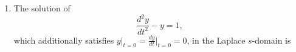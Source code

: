 \documentclass[12pt,onecolumn]{article}
\begin{document}
\begin{enumerate}
    \item The solution of
          \[ \frac{d^2 y}{dt^2} - y = 1, \]
          which additionally satisfies $y\big|_{t=0} = \frac{dy}{dt}\big|_{t=0} = 0$, in the Laplace $s$-domain is
          \begin{enumerate}
          \end{enumerate}


\end{enumerate}
\end{document}
